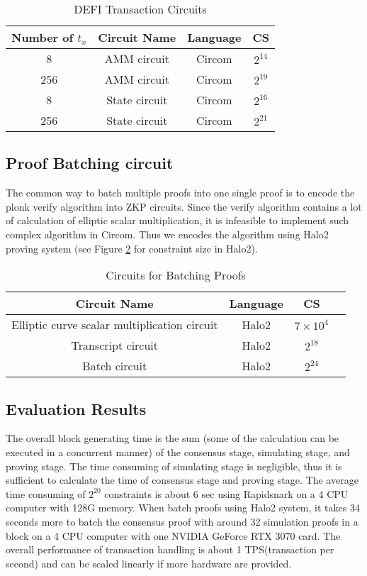 \begin{table}[h]
\small
\centering
\caption{DEFI Transaction Circuits}
\label{tbl:defi-cs}
\begin{tabular}{ | c | c | c | c | }
\hline
Number of $t_x$ & Circuit Name & Language & CS \\
\hline
8 & AMM circuit & Circom & $2^{14}$ \\
\hline
256 & AMM circuit & Circom & $2^{19}$ \\
\hline
8 & State circuit & Circom & $2^{16}$ \\
\hline
256 & State circuit & Circom & $2^{21}$ \\
\hline
\end{tabular}
\end{table}

\subsection{Proof Batching 
circuit}
The common way to batch multiple proofs into one single proof is to encode the plonk verify algorithm into ZKP circuits. Since the verify algorithm contains a lot of calculation of elliptic scalar multiplication, it is infeasible to implement such complex algorithm in Circom. Thus we encodes the algorithm using Halo2 \cite{halo2book} proving system (see Figure \ref{tbl:batch-proofs} for constraint size in Halo2).  

\begin{table}[!ht]
\small
\centering
\caption{Circuits for Batching Proofs}
\label{tbl:batch-proofs}
\begin{tabular}{ | c | c | c | c | }
\hline
Circuit Name & Language & CS \\
\hline
Elliptic curve scalar multiplication circuit & Halo2 & $7 \times 10^4$ \\
\hline
Transcript circuit & Halo2 & $2^{18}$ \\
\hline
Batch circuit & Halo2 & $2^{24}$ \\
\hline
\end{tabular}
\end{table}

\subsection{Evaluation Results}
The overall block generating time is the sum (some of the calculation can be executed in a concurrent manner) of the consensus stage, simulating stage, and proving stage. The time consuming of simulating stage is negligible, thus it is sufficient to calculate the time of consensus stage and proving stage. The average time consuming of $2^{20}$ constraints is about 6 sec using Rapidsnark on a 4 CPU computer with 128G memory. When batch proofs using Halo2 system, it takes 34 seconds more to batch the consensus proof with around 32 simulation proofs in a block on a 4 CPU computer with one NVIDIA GeForce RTX 3070 card. The overall performance of transaction handling is about 1 TPS(transaction per second) and can be scaled linearly if more hardware are provided.

